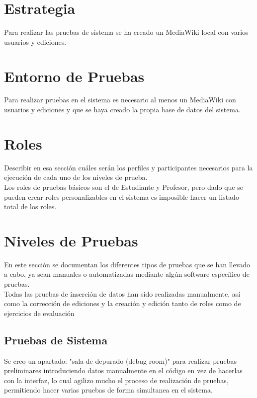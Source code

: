 

\section{Estrategia}
Para realizar las pruebas de sistema se ha creado un MediaWiki local con varios usuarios y ediciones.

\section{Entorno de Pruebas}
Para realizar pruebas en el sistema es necesario al menos un MediaWiki con usuarios y ediciones y que se haya creado la propia base de datos del sistema.

\section{Roles}
Describir en esa sección cuáles serán los perfiles y participantes necesarios para la ejecución de cada uno de los niveles de prueba.\\

Los roles de pruebas básicos son el de Estudiante y Profesor, pero dado que se pueden crear roles personalizables en el sistema es imposible hacer un listado total de los roles.

\section{Niveles de Pruebas}
En este sección se documentan los diferentes tipos de pruebas que se han llevado a cabo, ya sean manuales o automatizadas mediante algún software específico de pruebas.\\

Todas las pruebas de inserción de datos han sido realizadas manualmente, así como la corrección de ediciones y la creación y edición tanto de roles como de ejercicios de evaluación

\subsection{Pruebas de Sistema}
Se creo un apartado: "sala de depurado (debug room)" para realizar pruebas preliminares introduciendo datos manualmente en el código en vez de hacerlas con la interfaz, lo cual agilizo mucho el proceso de realización de pruebas, permitiendo hacer varias pruebas de forma simultanea en el sistema.

